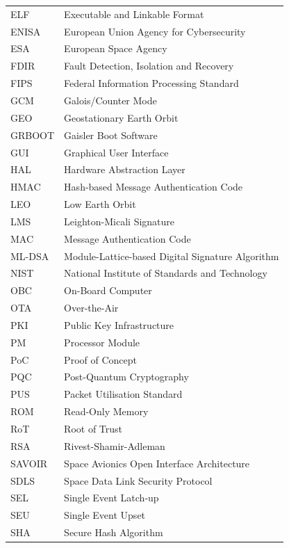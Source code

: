 \begin{longtable}{p{2.5cm}p{8cm}}
    ELF     & Executable and Linkable Format \\
    ENISA   & European Union Agency for Cybersecurity \\
    ESA     & European Space Agency \\
    FDIR    & Fault Detection, Isolation and Recovery \\
    FIPS    & Federal Information Processing Standard \\
    GCM     & Galois/Counter Mode \\
    GEO     & Geostationary Earth Orbit \\
    GRBOOT  & Gaisler Boot Software \\
    GUI     & Graphical User Interface \\
    HAL     & Hardware Abstraction Layer \\
    HMAC    & Hash-based Message Authentication Code \\
    LEO     & Low Earth Orbit \\
    LMS     & Leighton-Micali Signature \\
    MAC     & Message Authentication Code \\
    ML-DSA  & Module-Lattice-based Digital Signature Algorithm \\
    NIST    & National Institute of Standards and Technology \\
    OBC     & On-Board Computer \\
    OTA     & Over-the-Air \\
    PKI     & Public Key Infrastructure \\
    PM      & Processor Module \\
    PoC     & Proof of Concept \\
    PQC     & Post-Quantum Cryptography \\
    PUS     & Packet Utilisation Standard \\
    ROM     & Read-Only Memory \\
    RoT     & Root of Trust \\
    RSA     & Rivest-Shamir-Adleman \\
    SAVOIR  & Space Avionics Open Interface Architecture \\
    SDLS    & Space Data Link Security Protocol \\
    SEL     & Single Event Latch-up \\
    SEU     & Single Event Upset \\
    SHA     & Secure Hash Algorithm \\

\end{longtable}
